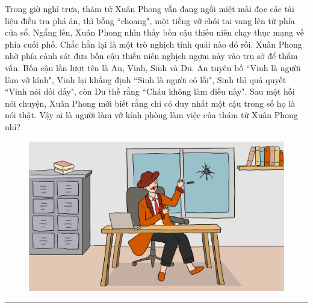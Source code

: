 \begin{multicols}{2}
	Trong giờ nghỉ trưa, thám tử Xuân Phong vẫn đang ngồi miệt mài đọc các tài liệu điều tra phá án, thì bỗng ``choang", một tiếng vỡ chói tai vang lên từ phía cửa sổ. Ngẩng lên, Xuân Phong nhìn thấy bốn cậu thiếu niên chạy thục mạng về phía cuối phố. Chắc hẳn lại là một trò nghịch tinh quái nào đó rồi.
	\vskip 0.15cm 
	Xuân Phong nhờ phía cảnh sát đưa bốn cậu thiếu niên nghịch ngợm này vào trụ sở để thẩm vấn. Bốn cậu lần lượt tên là An, Vinh, Sinh và Du. An tuyên bố ``Vinh là người làm vỡ kính", Vinh lại khẳng định ``Sinh là người có lỗi",  Sinh thì quả quyết ``Vinh nói dối đấy", còn Du thề rằng ``Cháu không làm điều này". 
	Sau một hồi nói chuyện, Xuân Phong mới biết rằng chỉ có duy nhất một cậu  trong số họ là nói thật. Vậy ai là người làm vỡ kính phòng làm việc của thám tử Xuân Phong nhỉ?
	\begin{figure}[H]
		\vspace*{-5pt}
		\centering
		\captionsetup{labelformat= empty, justification=centering}
		\includegraphics[width= 1\linewidth]{xp}
		\vspace*{-12pt}
	\end{figure}
\end{multicols}
\vspace*{-10pt}
\rule{1\linewidth}{0.1pt}
\begingroup
